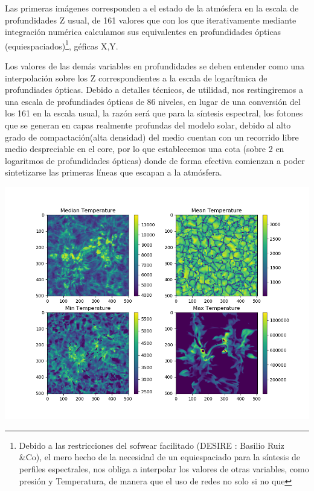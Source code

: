 \documentclass[8pt]{article}
\begin{document}
		Las primeras imágenes corresponden a el estado de la atmósfera en la escala de profundidades 
		Z usual, de 161 valores que con los que iterativamente mediante integración numérica calculamos sus equivalentes en profundidades ópticas (equiespaciados)\footnote{Debido a las restricciones del sofwear facilitado (DESIRE : Basilio Ruiz &Co), el mero hecho de la necesidad de un equiespaciado para la síntesis de perfiles espectrales, nos obliga a interpolar los valores de otras variables, como presión y Temperatura, de manera que el uso de redes no solo si no que }, géficas X,Y.\newline
		
		
		 Los valores de las demás variables en profundidades se deben entender como una interpolación sobre los Z correspondientes a la escala de logarítmica de profundiades ópticas. Debido a detalles técnicos, de utilidad, nos restingiremos a una escala de profundiades ópticas de 86 niveles, en lugar de una conversión del los 161 en la escala usual, la razón será que para la síntesis espectral, los fotones que se generan en capas realmente profundas del modelo solar, debido al alto grado de compactación(alta densidad) del medio cuentan con un recorrido libre medio despreciable en el core, por lo que establecemos una cota (sobre 2 en logaritmos de profundidades ópticas) donde de forma efectiva comienzan a poder sintetizarse las primeras líneas que escapan a la atmósfera. \newline
		
		\center \includegraphics[scale=0.5]{Temperature-Tau-Ok.png}		
		
\end{document}
